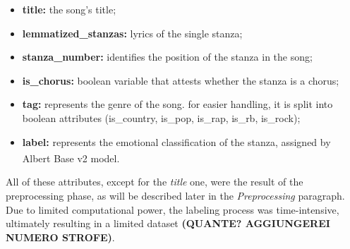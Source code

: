 \begin{itemize}
    \item \textbf{title:} the song's title;

    \item \textbf{lemmatized\_stanzas:} lyrics of the single stanza;
    
    \item \textbf{stanza\_number:} identifies the position of the stanza in the song;

    \item \textbf{is\_chorus:} boolean variable that attests whether the stanza is
        a chorus;
    
    \item \textbf{tag:} represents the genre of the song. for easier handling,
        it is split into boolean attributes
        (is\_country, is\_pop, is\_rap, is\_rb, is\_rock);

    \item \textbf{label:} represents the emotional classification of the stanza,
        assigned by Albert Base v2\textsuperscript{\cite{albert-base-v2}} model.
    
\end{itemize}

All of these attributes, except for the \textit{title} one, were the result of the preprocessing phase, as will be described later in the \textit{Preprocessing} paragraph.\\
Due to limited computational power, the labeling process was time-intensive,
ultimately resulting in a limited dataset \textbf{(QUANTE? AGGIUNGEREI NUMERO STROFE)}.\\